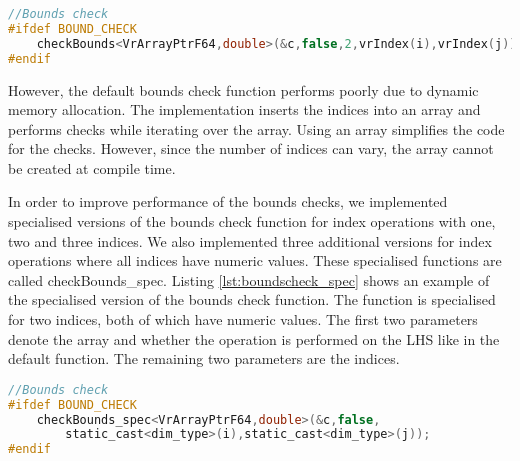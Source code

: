 \begin{lstlisting}[language=c,caption={An example of the bounds check function call.},label={lst:boundscheck}]
//Bounds check 
#ifdef BOUND_CHECK
	checkBounds<VrArrayPtrF64,double>(&c,false,2,vrIndex(i),vrIndex(j));
#endif
\end{lstlisting}


However, the default bounds check function performs poorly due to dynamic memory allocation. The implementation inserts the indices into an array and performs checks while iterating over the array. Using an array simplifies the code for the checks. However, since the number of indices can vary, the array cannot be created at compile time.

In order to improve performance of the bounds checks, we implemented specialised versions of the bounds check function for index operations with one, two and three indices. We also implemented three additional versions for index operations where all indices have numeric values. These specialised functions are called checkBounds\_spec. Listing \ref{lst:boundscheck_spec} shows an example of the specialised version of the bounds check function. The function is specialised for two indices, both of which have numeric values. The first two parameters denote the array and whether the operation is performed on the LHS like in the default function. The remaining two parameters are the indices. 
\begin{lstlisting}[float,language=c,caption={An example of the specialised bounds check function call},label={lst:boundscheck_spec}]
//Bounds check 
#ifdef BOUND_CHECK
	checkBounds_spec<VrArrayPtrF64,double>(&c,false,
		static_cast<dim_type>(i),static_cast<dim_type>(j));
#endif
\end{lstlisting}
